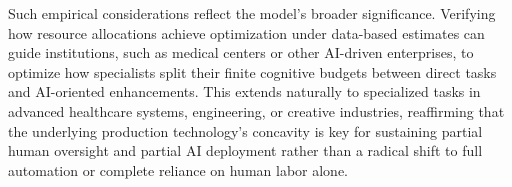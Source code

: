 Such empirical considerations reflect the model's broader significance. Verifying how resource allocations achieve optimization under data-based estimates can guide institutions, such as medical centers or other AI-driven enterprises, to optimize how specialists split their finite cognitive budgets between direct tasks and AI-oriented enhancements. This extends naturally to specialized tasks in advanced healthcare systems, engineering, or creative industries, reaffirming that the underlying production technology's concavity is key for sustaining partial human oversight and partial AI deployment rather than a radical shift to full automation or complete reliance on human labor alone.